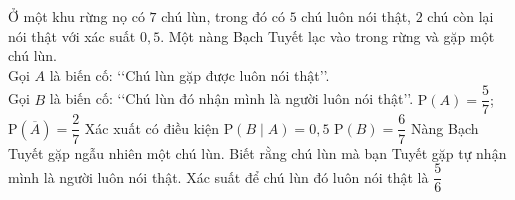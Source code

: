 %

\begin{ex}%
	Ở một khu rừng nọ có $7$ chú lùn, trong đó có $5$ chú luôn nói thật, $2$ chú còn lại nói thật với xác suất $0{,}5$. Một nàng Bạch Tuyết lạc vào trong rừng và gặp một chú lùn.\\
	Gọi $A$ là biến cố: \lq\lq Chú lùn gặp được luôn nói thật\rq\rq.\\
	Gọi $B$ là biến cố: \lq\lq Chú lùn đó nhận mình là người luôn nói thật\rq\rq.
	\choiceTF
	{\True $\mathrm{P}(A)=\dfrac{5}{7}$; $\mathrm{P}(\overline{A})=\dfrac{2}{7}$}
	{Xác xuất có điều kiện $\mathrm{P}(B\mid A)=0{,}5$}
	{\True $\mathrm{P}(B)=\dfrac{6}{7}$}
	{\True Nàng Bạch Tuyết gặp ngẫu nhiên một chú lùn. Biết rằng chú lùn mà bạn Tuyết gặp tự nhận mình là người luôn nói thật. Xác suất để chú lùn đó luôn nói thật là $\dfrac{5}{6}$}
\end{ex}

